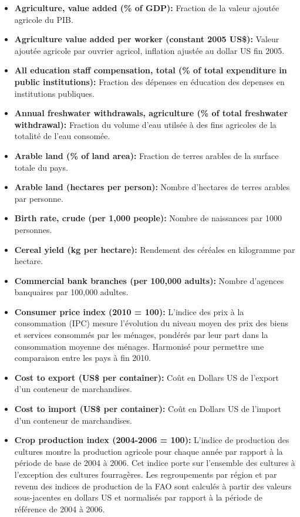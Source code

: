 \begin{itemize}
		\item \textbf{ Agriculture, value added (\% of GDP):} Fraction de la valeur ajoutée agricole du PIB.
		\item \textbf{ Agriculture value added per worker (constant 2005 US\$):} Valeur ajoutée agricole par ouvrier agricol, inflation ajustée au dollar US fin 2005.
		\item \textbf{ All education staff compensation, total (\% of total expenditure in public institutions):} Fraction des dépenses en éducation des depenses en institutions publiques.
		\item \textbf{ Annual freshwater withdrawals, agriculture (\% of total freshwater withdrawal):} Fraction du volume d'eau utilsée à des fins agricoles de la totalité de l'eau consomée.
		\item \textbf{ Arable land (\% of land area):} Fraction de terres arables de la surface totale du pays.
		\item \textbf{ Arable land (hectares per person):} Nombre d'hectares de terres arables par personne.
		\item \textbf{ Birth rate, crude (per 1,000 people):} Nombre de naissances par 1000 personnes.
		\item \textbf{ Cereal yield (kg per hectare):} Rendement des céréales en kilogramme par hectare.
		\item \textbf{ Commercial bank branches (per 100,000 adults):} Nombre d'agences banquaires par 100,000 adultes.
		\item \textbf{ Consumer price index (2010 = 100):} L'indice des prix à la consommation (IPC) mesure l'évolution du niveau moyen des prix des biens et services consommés par les ménages, pondérés par leur part dans la consommation moyenne des ménages. Harmonisé pour permettre une comparaison entre les pays à fin 2010.
		\item \textbf{ Cost to export (US\$ per container):} Coût en Dollars US de l'export d'un conteneur de marchandises.
		\item \textbf{ Cost to import (US\$ per container):} Coût en Dollars US de l'import d'un conteneur de marchandises.
		\item \textbf{ Crop production index (2004-2006 = 100):} 
		L'indice de production des cultures montre la production agricole pour chaque année par rapport à la période de base de 2004 à 2006. Cet indice porte sur l'ensemble des cultures à l'exception des cultures fourragères. Les regroupements par région et par revenu des indices de production de la FAO sont calculés à partir des valeurs sous-jacentes en dollars US et normalisés par rapport à la période de référence de 2004 à 2006.

\end{itemize}

